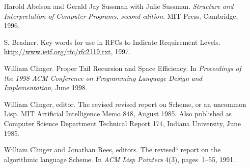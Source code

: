 \begin{thebibliography}{999}

Harold Abelson and Gerald Jay Sussman with Julie Sussman.
{\em Structure and Interpretation of Computer Programs, second edition.}
MIT Press, Cambridge, 1996.


S. Bradner.
Key words for use in RFCs to Indicate Requirement Levels.
\url{http://www.ietf.org/rfc/rfc2119.txt}, 1997.



William Clinger.
Proper Tail Recursion and Space Efficiency.
In {\em Proceedings of the 1998 ACM Conference on Programming
 Language Design and Implementation}, June 1998.


William Clinger, editor.
The revised revised report on Scheme, or an uncommon Lisp.
MIT Artificial Intelligence Memo 848, August 1985.
Also published as Computer Science Department Technical Report 174,
  Indiana University, June 1985.


William Clinger and Jonathan Rees, editors.
The revised$^4$ report on the algorithmic language Scheme.
In {\em ACM Lisp Pointers} 4(3), pages~1--55, 1991.



\end{thebibliography}
